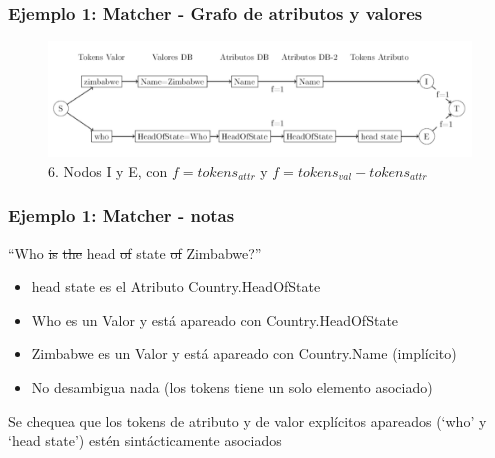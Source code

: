 \begin{frame}
\frametitle{Ejemplo 1: Matcher - Grafo de atributos y valores}
\begin{figure}
  \centering
    \includegraphics[scale=.33]{graficos/presentacion/ejemplo-grafo-matcher-1-6}
    \caption{6. Nodos I y E, con $f=tokens_{attr}$ y $f=tokens_{val} - tokens_{attr}$}
\end{figure}
\end{frame}


\begin{frame}[t]
\frametitle{Ejemplo 1: Matcher - notas}
\Large{``{\color{blue}Who} \st{is} \st{the} {\color{blue}head} \st{of} {\color{blue}state} \st{of} {\color{red}Zimbabwe}?''}
\normalsize{
\begin{itemize}
  \item {\color{blue}head state} es el Atributo {\color{blue}Country.HeadOfState}
  \item {\color{blue}Who} es un Valor y está apareado con {\color{blue}Country.HeadOfState} 
  \item {\color{red}Zimbabwe} es un Valor y está apareado con {\color{red}Country.Name} (implícito)
  \item No desambigua nada (los tokens tiene un solo elemento asociado)
\end{itemize}
}
\bigskip
Se chequea que los tokens de atributo y de valor explícitos apareados (`who' y `head state') estén sintácticamente asociados

\end{frame}



